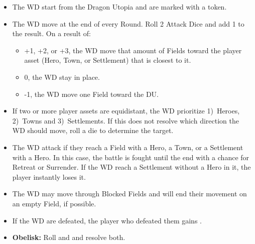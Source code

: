 \begin{multicols}{2}
\begin{itemize}
  \item The WD start from the Dragon Utopia and are marked with a  token.
  \item The WD move at the end of every Round. Roll 2 Attack Dice and add 1 to the result. On a result of:
  \begin{itemize}
    \item +1, +2, or +3, the WD move that amount of Fields toward the player asset (Hero, Town, or Settlement) that is closest to it.
    \item 0, the WD stay in place.
    \item -1, the WD move one Field toward the DU.
  \end {itemize}
  \item If two or more player assets are equidistant, the WD prioritize 1)~Heroes, 2)~Towns and 3)~Settlements.
    If this does not resolve which direction the WD should move, roll a die to determine the target.
  \item The WD attack if they reach a Field with a Hero, a Town, or a Settlement with a Hero.
    In this case, the battle is fought until the end with a chance for Retreat or Surrender.
    If the WD reach a Settlement without a Hero in it, the player instantly loses it.
  \item The WD may move through Blocked Fields and will end their movement on an empty Field, if possible.
  \item If the WD are defeated, the player who defeated them gains .
  \item \textbf{Obelisk:} Roll  and  and resolve both.
\end{itemize}
\end{multicols}

